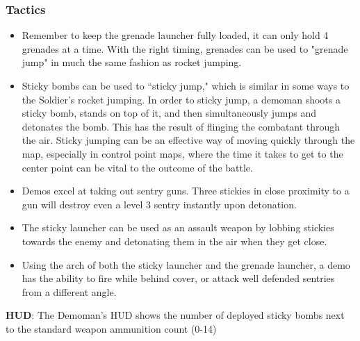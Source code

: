 \subsubsection {Tactics}
\begin {itemize}
\item Remember to keep the grenade launcher fully loaded, it can only hold 4 grenades at a time.  With the right timing, grenades can be used to "grenade jump" in much the same fashion as rocket jumping.

\item Sticky bombs can be used to “sticky jump," which is similar in some ways to the Soldier's rocket jumping.  In order to sticky jump, a demoman shoots a sticky bomb, stands on top of it, and then simultaneously jumps and detonates the bomb. This has the result of flinging the combatant through the air.  Sticky jumping can be an effective way of moving quickly through the map, especially in control point maps, where the time it takes to get to the center point can be vital to the outcome of the battle.

\item Demos excel at taking out sentry guns. Three stickies in close proximity to a gun will destroy even a level 3 sentry instantly upon detonation.

\item The sticky launcher can be used as an assault weapon by lobbing stickies towards the enemy and detonating them in the air when they get close.

\item Using the arch of both the sticky launcher and the grenade launcher, a demo has the ability to fire while behind cover, or attack well defended sentries from a different angle.

\end {itemize}
{\bf HUD}:
The Demoman's HUD shows the number of deployed sticky bombs next to the standard weapon ammunition count (0-14)